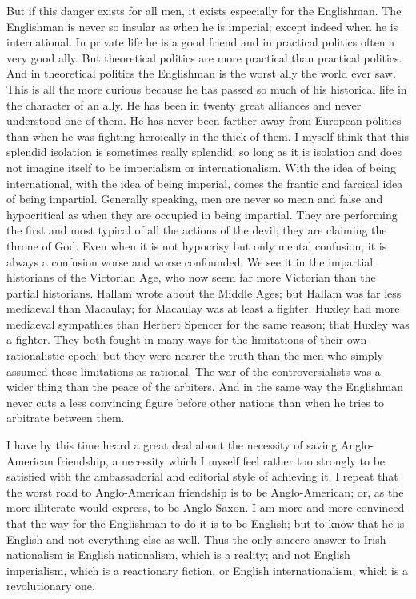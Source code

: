\documentclass{book}
\begin{document}
But if this danger exists for all men, it exists especially for the Englishman. The Englishman is never so insular as when he is imperial; except indeed when he is international. In private life he is a good friend and in practical politics often a very good ally. But theoretical politics are more practical than practical politics. And in theoretical politics the Englishman is the worst ally the world ever saw. This is all the more curious because he has passed so much of his historical life in the character of an ally. He has been in twenty great alliances and never understood one of them. He has never been farther away from European politics than when he was fighting heroically in the thick of them. I myself think that this splendid isolation is sometimes really splendid; so long as it is isolation and does not imagine itself to be imperialism or internationalism. With the idea of being international, with the idea of being imperial, comes the frantic and farcical idea of being impartial. Generally speaking, men are never so mean and false and hypocritical as when they are occupied in being impartial. They are performing the first and most typical of all the actions of the devil; they are claiming the throne of God. Even when it is not hypocrisy but only mental confusion, it is always a confusion worse and worse confounded. We see it in the impartial historians of the Victorian Age, who now seem far more Victorian than the partial historians. Hallam wrote about the Middle Ages; but Hallam was far less mediaeval than Macaulay; for Macaulay was at least a fighter. Huxley had more mediaeval sympathies than Herbert Spencer for the same reason; that Huxley was a fighter. They both fought in many ways for the limitations of their own rationalistic epoch; but they were nearer the truth than the men who simply assumed those limitations as rational. The war of the controversialists was a wider thing than the peace of the arbiters. And in the same way the Englishman never cuts a less convincing figure before other nations than when he tries to arbitrate between them.

I have by this time heard a great deal about the necessity of saving Anglo-American friendship, a necessity which I myself feel rather too strongly to be satisfied with the ambassadorial and editorial style of achieving it. I repeat that the worst road to Anglo-American friendship is to be Anglo-American; or, as the more illiterate would express, to be Anglo-Saxon. I am more and more convinced that the way for the Englishman to do it is to be English; but to know that he is English and not everything else as well. Thus the only sincere answer to Irish nationalism is English nationalism, which is a reality; and not English imperialism, which is a reactionary fiction, or English internationalism, which is a revolutionary one.
\end{document}

